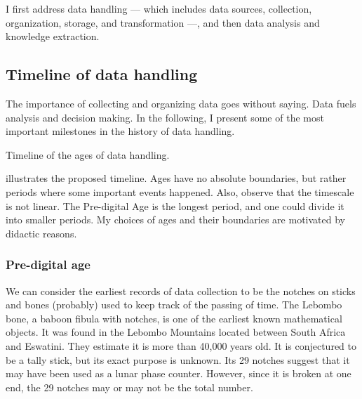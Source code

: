 I first address data handling --- which includes data sources, collection, organization,
storage, and transformation ---, and then data analysis and knowledge extraction.

\subsection{Timeline of data handling}
\label{sub:time-handling}

The importance of collecting and organizing data goes without saying.  Data fuels analysis and
decision making.  In the following, I present some of the most important milestones in the history
of data handling.

\begin{figurebox}[label=fig:data-handling-history]{Timeline of the ages of data handling.}
  \centering
\end{figurebox}

 illustrates the proposed timeline.  Ages have no absolute
boundaries, but rather periods where some important events happened.  Also, observe that
the timescale is not linear.  The Pre-digital Age is the longest period, and one could
divide it into smaller periods.  My choices of ages and their boundaries are motivated by
didactic reasons.

\subsubsection{Pre-digital age}

We can consider the earliest records of data collection to be the notches on sticks and
bones (probably) used to keep track of the passing of time.  The Lebombo bone, a baboon fibula with
notches, is one of the earliest known mathematical objects.  It was found in the Lebombo
Mountains located between South Africa and Eswatini.
They estimate it is more
than 40,000 years old. It is conjectured to be a tally stick, but its exact purpose is
unknown. Its 29 notches suggest that it may have been used as a lunar phase counter.
However, since it is broken at one end, the 29 notches may or may not be the total
number.

